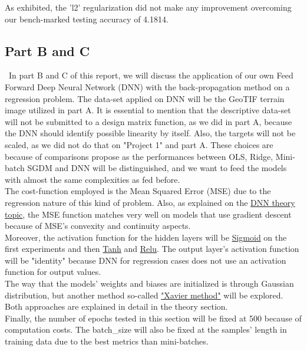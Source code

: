 As exhibited, the 'l2' regularization did not make any improvement overcoming our bench-marked testing accuracy of 4.1814.

\subsection{Part B and C}
\label{chap:Part B and C}

\qquad \, In part B and C of this report, we will discuss the application of our own Feed Forward Deep Neural Network (DNN) with the back-propagation method on a regression problem. The data-set applied on DNN will be the GeoTIF terrain image utilized in part A. It is essential to mention that the descriptive data-set will not be submitted to a design matrix function, as we did in part A, because the DNN should identify possible linearity by itself. Also, the targets will not be scaled, as we did not do that on "Project 1" and part A. These choices are because of comparisons propose as the performances between OLS, Ridge, Mini-batch SGDM and DNN will be distinguished, and we want to feed the models with almost the same complexities as fed before.\\

The cost-function employed is the Mean Squared Error (MSE) due to the regression nature of this kind of problem. Also, as explained on the \hyperref[chap:Deep Neural Networks]{DNN theory topic}, the MSE function matches very well on models that use gradient descent because of MSE's convexity and continuity aspects.\\

Moreover, the activation function for the hidden layers will be \hyperref[chap:Sigmoid]{Sigmoid} on the first experiments and then \hyperref[chap:Hyperbolic tanh]{Tanh} and \hyperref[chap:Rectified Linear Unit]{Relu}. The output layer's activation function will be "identity" because DNN for regression cases does not use an activation function for output values.\\

The way that the models' weights and biases are initialized is through Gaussian distribution, but another method so-called \hyperref[chap:Xavier and He weights initialization method]{"Xavier method"} will be explored. Both approaches are explained in detail in the theory section.\\

Finally, the number of epochs tested in this section will be fixed at 500 because of computation costs. The batch\_size will also be fixed at the samples' length in training data due to the best metrics than mini-batches.

